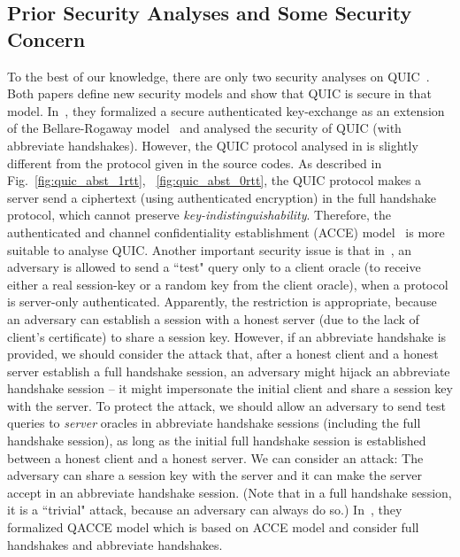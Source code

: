 \subsection{Prior Security Analyses and Some Security Concern} \label{sec:concern}
To the best of our knowledge, there are only two
security analyses on QUIC~\cite{FG14:QUIC,LJBN15:QUIC}.
Both papers define new security models and show that
QUIC is secure in that model.
In~\cite{FG14:QUIC}, they formalized a secure
authenticated key-exchange as an extension of the
Bellare-Rogaway model~\cite{BR93:AKE} and analysed the
security of QUIC (with abbreviate handshakes).
However, the QUIC protocol analysed in \cite{FG14:QUIC}
is slightly different from the protocol given in the
source codes.
As described in Fig.~\ref{fig:quic_abst_1rtt},
~\ref{fig:quic_abst_0rtt}, the QUIC protocol makes a
server send a ciphertext (using authenticated
encryption) in the full handshake protocol, which cannot
preserve \textit{key-indistinguishability}.
Therefore, the authenticated and channel confidentiality
establishment (ACCE) model~\cite{JKSS12:ACCE} is more
suitable to analyse QUIC.
Another important security issue is that in~\cite{FG14:QUIC},
an adversary is allowed to send a ``test" query only to
a client oracle (to receive either a real session-key or
a random key from the client oracle), when a protocol
is server-only authenticated.
Apparently, the restriction is appropriate, because
an adversary can establish a session with a honest
server (due to the lack of client's certificate) to
share a session key.
However, if an abbreviate handshake is provided, we should consider
the attack that, after a honest client and a honest
server establish a full handshake session, an adversary
might hijack an abbreviate handshake session -- it might
impersonate the initial client and share a session key
with the server.
To protect the attack, we should allow an adversary to
send test queries to \textit{server} oracles in abbreviate
handshake sessions (including the full handshake session), as long
as the initial full handshake session is established
between a honest client and a honest server.
We can consider an attack: The adversary can
share a session key with the server and it can make the
server accept in an abbreviate handshake session. (Note that in a
full handshake session, it is a ``trivial" attack, because
an adversary can always do so.)
In~\cite{LJBN15:QUIC}, they formalized QACCE model which
is based on ACCE model and consider full handshakes and
abbreviate handshakes.
